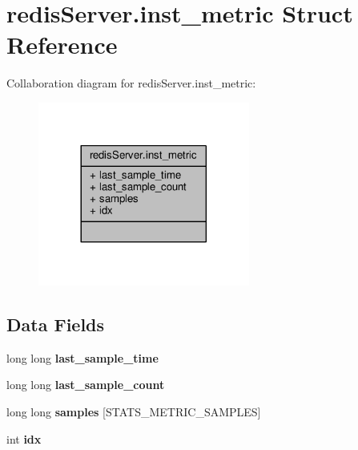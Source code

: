 \hypertarget{structredisServer_8inst__metric}{}\section{redis\+Server.\+inst\+\_\+metric Struct Reference}
\label{structredisServer_8inst__metric}


Collaboration diagram for redis\+Server.\+inst\+\_\+metric\+:\nopagebreak
\begin{figure}[H]
\begin{center}
\leavevmode
\includegraphics[width=197pt]{structredisServer_8inst__metric__coll__graph}
\end{center}
\end{figure}
\subsection*{Data Fields}
\begin{DoxyCompactItemize}
\item 
\mbox{\label{structredisServer_8inst__metric_a4bbcaa26b68768f7aab17e65e4f99696}} 
long long {\bfseries last\+\_\+sample\+\_\+time}
\item 
\mbox{\label{structredisServer_8inst__metric_a75ce0463d0689776a59bcef3a8ca558a}} 
long long {\bfseries last\+\_\+sample\+\_\+count}
\item 
\mbox{\label{structredisServer_8inst__metric_a8a8af1648e93767209634024f4b62ab9}} 
long long {\bfseries samples} \mbox{[}S\+T\+A\+T\+S\+\_\+\+M\+E\+T\+R\+I\+C\+\_\+\+S\+A\+M\+P\+L\+ES\mbox{]}
\item 
\mbox{\label{structredisServer_8inst__metric_a7f9bec28bc8902d45d905788d7aa59a1}} 
int {\bfseries idx}
\end{DoxyCompactItemize}


